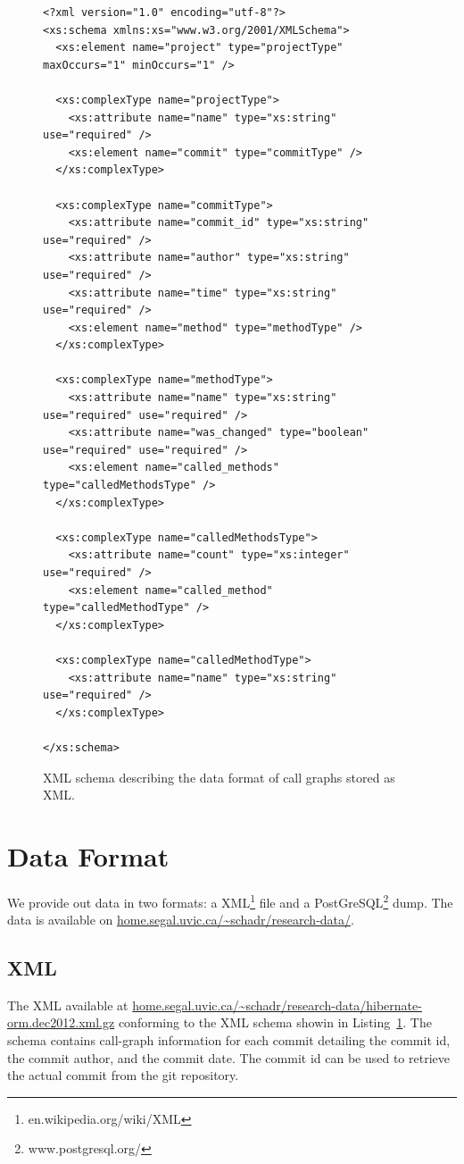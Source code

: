 \documentclass[conference]{IEEEtran}
\begin{document}
\begin{figure}[th!]
\lstset{language=XML}
\begin{lstlisting}
<?xml version="1.0" encoding="utf-8"?>
<xs:schema xmlns:xs="www.w3.org/2001/XMLSchema">
  <xs:element name="project" type="projectType" maxOccurs="1" minOccurs="1" />

  <xs:complexType name="projectType">
    <xs:attribute name="name" type="xs:string" use="required" />
    <xs:element name="commit" type="commitType" />
  </xs:complexType>

  <xs:complexType name="commitType">
    <xs:attribute name="commit_id" type="xs:string" use="required" />
    <xs:attribute name="author" type="xs:string" use="required" />
    <xs:attribute name="time" type="xs:string" use="required" />
    <xs:element name="method" type="methodType" />     
  </xs:complexType>

  <xs:complexType name="methodType">
    <xs:attribute name="name" type="xs:string" use="required" use="required" />
    <xs:attribute name="was_changed" type="boolean" use="required" use="required" />
    <xs:element name="called_methods" type="calledMethodsType" />
  </xs:complexType>
  
  <xs:complexType name="calledMethodsType">
    <xs:attribute name="count" type="xs:integer" use="required" />
    <xs:element name="called_method" type="calledMethodType" />
  </xs:complexType>
  
  <xs:complexType name="calledMethodType">
    <xs:attribute name="name" type="xs:string" use="required" />
  </xs:complexType>

</xs:schema>
\end{lstlisting}
\caption{XML schema describing the data format of call graphs stored as XML.}
\label{list:xml:schema}
\end{figure}



\section{Data Format}
\label{sec:df}
We provide out data in two formats: a XML\footnote{en.wikipedia.org/wiki/XML} file and a PostGreSQL\footnote{www.postgresql.org/} dump.
The data is available on 
\url{home.segal.uvic.ca/~schadr/research-data/}.

\subsection{XML}
The XML available at
\url{home.segal.uvic.ca/~schadr/research-data/hibernate-orm.dec2012.xml.gz}
conforming to the XML schema showin in Listing~\ref{list:xml:schema}.
The schema contains call-graph information for each commit detailing the commit id, the commit author, and the commit date.
The commit id can be used to retrieve the actual commit from the git repository.
\end{document}
